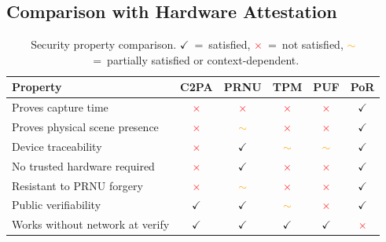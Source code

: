 \documentclass[11pt]{article}
\begin{document}
\subsection{Comparison with Hardware Attestation}

\begin{table}[h]
\centering
\caption{Security property comparison.
  \textcolor{green!60!black}{$\checkmark$}~=~satisfied,
  \textcolor{red}{$\times$}~=~not satisfied,
  \textcolor{orange}{$\sim$}~=~partially satisfied or context-dependent.}
\label{tab:comparison}
\begin{tabular}{lccccc}
\toprule
\textbf{Property} & \textbf{C2PA} & \textbf{PRNU} & \textbf{TPM} & \textbf{PUF} & \textbf{PoR} \\
\midrule
Proves capture time             & \textcolor{red}{$\times$} & \textcolor{red}{$\times$} & \textcolor{red}{$\times$} & \textcolor{red}{$\times$} & \textcolor{green!60!black}{$\checkmark$} \\
Proves physical scene presence  & \textcolor{red}{$\times$} & \textcolor{orange}{$\sim$} & \textcolor{red}{$\times$} & \textcolor{red}{$\times$} & \textcolor{green!60!black}{$\checkmark$} \\
Device traceability             & \textcolor{red}{$\times$} & \textcolor{green!60!black}{$\checkmark$} & \textcolor{orange}{$\sim$} & \textcolor{orange}{$\sim$} & \textcolor{green!60!black}{$\checkmark$} \\
No trusted hardware required    & \textcolor{red}{$\times$} & \textcolor{green!60!black}{$\checkmark$} & \textcolor{red}{$\times$} & \textcolor{red}{$\times$} & \textcolor{green!60!black}{$\checkmark$} \\
Resistant to PRNU forgery       & \textcolor{red}{$\times$} & \textcolor{orange}{$\sim$} & \textcolor{red}{$\times$} & \textcolor{red}{$\times$} & \textcolor{green!60!black}{$\checkmark$} \\
Public verifiability            & \textcolor{green!60!black}{$\checkmark$} & \textcolor{green!60!black}{$\checkmark$} & \textcolor{orange}{$\sim$} & \textcolor{red}{$\times$} & \textcolor{green!60!black}{$\checkmark$} \\
Works without network at verify & \textcolor{green!60!black}{$\checkmark$} & \textcolor{green!60!black}{$\checkmark$} & \textcolor{green!60!black}{$\checkmark$} & \textcolor{green!60!black}{$\checkmark$} & \textcolor{red}{$\times$} \\
\bottomrule
\end{tabular}
\end{table}
\end{document}
